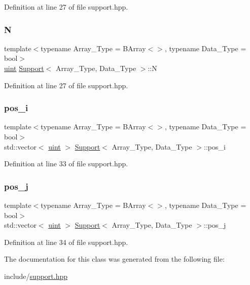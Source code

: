 Definition at line 27 of file support.\+hpp.

\mbox{\label{class_support_ab15c7125d6b99ae15ec4dbb34c9ce9b6}} 
\subsubsection{\texorpdfstring{N}{N}}
{\footnotesize\ttfamily template$<$typename Array\+\_\+\+Type = B\+Array$<$$>$, typename Data\+\_\+\+Type = bool$>$ \\
\hyperlink{typedefs_8hpp_a91ad9478d81a7aaf2593e8d9c3d06a14}{uint} \hyperlink{class_support}{Support}$<$ Array\+\_\+\+Type, Data\+\_\+\+Type $>$\+::N}



Definition at line 27 of file support.\+hpp.

\mbox{\label{class_support_a8e3b2d36d26bb771d1a49dfaad75b966}} 
\subsubsection{\texorpdfstring{pos\+\_\+i}{pos\_i}}
{\footnotesize\ttfamily template$<$typename Array\+\_\+\+Type = B\+Array$<$$>$, typename Data\+\_\+\+Type = bool$>$ \\
std\+::vector$<$ \hyperlink{typedefs_8hpp_a91ad9478d81a7aaf2593e8d9c3d06a14}{uint} $>$ \hyperlink{class_support}{Support}$<$ Array\+\_\+\+Type, Data\+\_\+\+Type $>$\+::pos\+\_\+i}



Definition at line 33 of file support.\+hpp.

\mbox{\label{class_support_ac256816f09e47a843cf478a470223a5b}} 
\subsubsection{\texorpdfstring{pos\+\_\+j}{pos\_j}}
{\footnotesize\ttfamily template$<$typename Array\+\_\+\+Type = B\+Array$<$$>$, typename Data\+\_\+\+Type = bool$>$ \\
std\+::vector$<$ \hyperlink{typedefs_8hpp_a91ad9478d81a7aaf2593e8d9c3d06a14}{uint} $>$ \hyperlink{class_support}{Support}$<$ Array\+\_\+\+Type, Data\+\_\+\+Type $>$\+::pos\+\_\+j}



Definition at line 34 of file support.\+hpp.



The documentation for this class was generated from the following file\+:\begin{DoxyCompactItemize}
\item 
include/\hyperlink{support_8hpp}{support.\+hpp}\end{DoxyCompactItemize}
